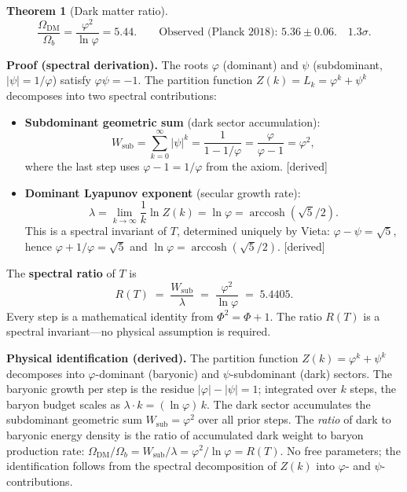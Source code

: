 \documentclass[12pt,a4paper]{article}
\newtheorem{theorem}{Theorem}[section]
\begin{document}
\begin{theorem}[Dark matter ratio]
\begin{equation}
\frac{\Omega_{\mathrm{DM}}}{\Omega_b} = \frac{\varphi^2}{\ln\varphi} = 5.44.
\qquad\text{Observed (Planck 2018): }5.36 \pm 0.06.\quad 1.3\sigma.
\end{equation}
\end{theorem}

\textbf{Proof (spectral derivation).} The roots $\varphi$ (dominant) and $\psi$ (subdominant, $|\psi| = 1/\varphi$) satisfy $\varphi\psi = -1$. The partition function $Z(k) = L_k = \varphi^k + \psi^k$ decomposes into two spectral contributions:
\begin{itemize}
\item \textbf{Subdominant geometric sum} (dark sector accumulation):
\begin{equation}
W_{\mathrm{sub}} = \sum_{k=0}^{\infty} |\psi|^k = \frac{1}{1-1/\varphi} = \frac{\varphi}{\varphi-1} = \varphi^2,
\end{equation}
where the last step uses $\varphi - 1 = 1/\varphi$ from the axiom. [derived]
\item \textbf{Dominant Lyapunov exponent} (secular growth rate):
\begin{equation}
\lambda = \lim_{k\to\infty} \frac{1}{k}\ln Z(k) = \ln\varphi = \operatorname{arccosh}(\sqrt{5}/2).
\end{equation}
This is a spectral invariant of $T$, determined uniquely by Vieta: $\varphi - \psi = \sqrt{5}$, hence $\varphi + 1/\varphi = \sqrt{5}$ and $\ln\varphi = \operatorname{arccosh}(\sqrt{5}/2)$. [derived]
\end{itemize}
The \textbf{spectral ratio} of $T$ is
\begin{equation}
R(T) \;=\; \frac{W_{\mathrm{sub}}}{\lambda} \;=\; \frac{\varphi^2}{\ln\varphi} \;=\; 5.4405.
\end{equation}
Every step is a mathematical identity from $\Phi^2 = \Phi + 1$. The ratio $R(T)$ is a spectral invariant---no physical assumption is required.

\textbf{Physical identification (derived).} The partition function $Z(k) = \varphi^k + \psi^k$ decomposes into $\varphi$-dominant (baryonic) and $\psi$-subdominant (dark) sectors. The baryonic growth per step is the residue $|\varphi| - |\psi| = 1$; integrated over $k$ steps, the baryon budget scales as $\lambda \cdot k = (\ln\varphi)\,k$. The dark sector accumulates the subdominant geometric sum $W_{\mathrm{sub}} = \varphi^2$ over all prior steps. The \emph{ratio} of dark to baryonic energy density is the ratio of accumulated dark weight to baryon production rate: $\Omega_{\mathrm{DM}}/\Omega_b = W_{\mathrm{sub}}/\lambda = \varphi^2/\ln\varphi = R(T)$. No free parameters; the identification follows from the spectral decomposition of $Z(k)$ into $\varphi$- and $\psi$-contributions.
\end{document}
